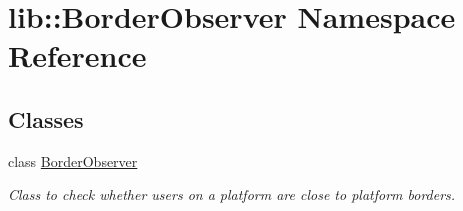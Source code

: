 \hypertarget{namespacelib_1_1BorderObserver}{\section{lib\-:\-:\-Border\-Observer \-Namespace \-Reference}
\label{namespacelib_1_1BorderObserver}
}
\subsection*{\-Classes}
\begin{DoxyCompactItemize}
\item 
class \hyperlink{classlib_1_1BorderObserver_1_1BorderObserver}{\-Border\-Observer}
\begin{DoxyCompactList}\small\item\em \-Class to check whether users on a platform are close to platform borders. \end{DoxyCompactList}\end{DoxyCompactItemize}
